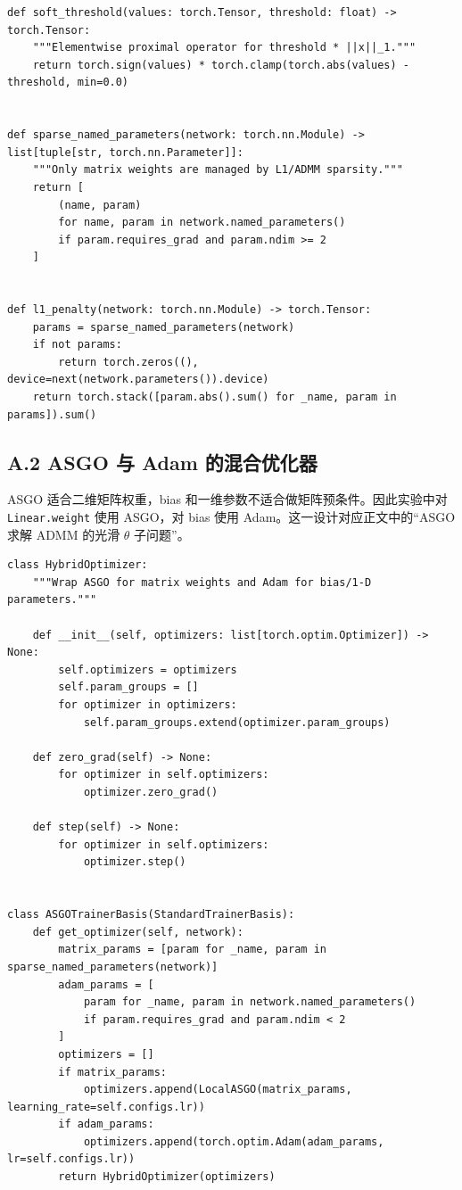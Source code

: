 \documentclass[UTF8,a4paper,12pt,fontset=none]{ctexart}
\begin{document}
\begin{lstlisting}
def soft_threshold(values: torch.Tensor, threshold: float) -> torch.Tensor:
    """Elementwise proximal operator for threshold * ||x||_1."""
    return torch.sign(values) * torch.clamp(torch.abs(values) - threshold, min=0.0)


def sparse_named_parameters(network: torch.nn.Module) -> list[tuple[str, torch.nn.Parameter]]:
    """Only matrix weights are managed by L1/ADMM sparsity."""
    return [
        (name, param)
        for name, param in network.named_parameters()
        if param.requires_grad and param.ndim >= 2
    ]


def l1_penalty(network: torch.nn.Module) -> torch.Tensor:
    params = sparse_named_parameters(network)
    if not params:
        return torch.zeros((), device=next(network.parameters()).device)
    return torch.stack([param.abs().sum() for _name, param in params]).sum()
\end{lstlisting}

\subsection{A.2 ASGO 与 Adam 的混合优化器}

ASGO 适合二维矩阵权重，bias 和一维参数不适合做矩阵预条件。因此实验中对 \texttt{Linear.weight} 使用 ASGO，对 bias 使用 Adam。这一设计对应正文中的“ASGO 求解 ADMM 的光滑 $\theta$ 子问题”。

\begin{lstlisting}
class HybridOptimizer:
    """Wrap ASGO for matrix weights and Adam for bias/1-D parameters."""

    def __init__(self, optimizers: list[torch.optim.Optimizer]) -> None:
        self.optimizers = optimizers
        self.param_groups = []
        for optimizer in optimizers:
            self.param_groups.extend(optimizer.param_groups)

    def zero_grad(self) -> None:
        for optimizer in self.optimizers:
            optimizer.zero_grad()

    def step(self) -> None:
        for optimizer in self.optimizers:
            optimizer.step()


class ASGOTrainerBasis(StandardTrainerBasis):
    def get_optimizer(self, network):
        matrix_params = [param for _name, param in sparse_named_parameters(network)]
        adam_params = [
            param for _name, param in network.named_parameters()
            if param.requires_grad and param.ndim < 2
        ]
        optimizers = []
        if matrix_params:
            optimizers.append(LocalASGO(matrix_params, learning_rate=self.configs.lr))
        if adam_params:
            optimizers.append(torch.optim.Adam(adam_params, lr=self.configs.lr))
        return HybridOptimizer(optimizers)
\end{lstlisting}
\end{document}
